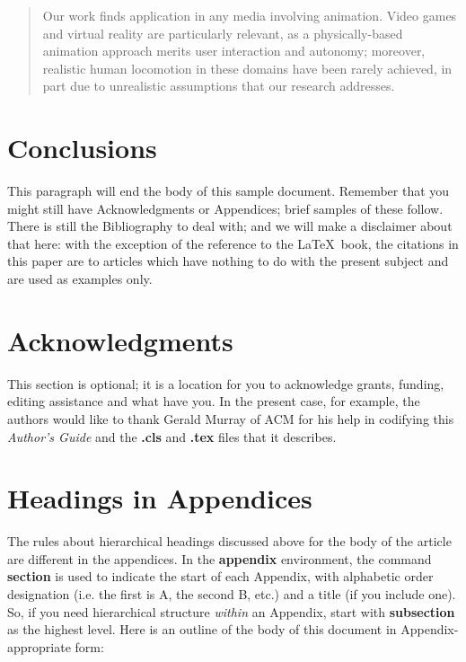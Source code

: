 \documentclass{sig-alternate-05-2015}
\begin{document}
\begin{abstract}
	Our work finds application in any media involving animation. Video games and virtual reality are particularly relevant, as a physically-based animation approach merits user interaction and autonomy; moreover, realistic human locomotion in these domains have been rarely achieved, in part due to unrealistic assumptions that our research addresses.
	
\end{abstract}





\iffalse

\section{Conclusions}
This paragraph will end the body of this sample document.
Remember that you might still have Acknowledgments or
Appendices; brief samples of these
follow.  There is still the Bibliography to deal with; and
we will make a disclaimer about that here: with the exception
of the reference to the \LaTeX\ book, the citations in
this paper are to articles which have nothing to
do with the present subject and are used as
examples only.

\section{Acknowledgments}
This section is optional; it is a location for you
to acknowledge grants, funding, editing assistance and
what have you.  In the present case, for example, the
authors would like to thank Gerald Murray of ACM for
his help in codifying this \textit{Author's Guide}
and the \textbf{.cls} and \textbf{.tex} files that it describes.

%

%
%
\appendix
\section{Headings in Appendices}
The rules about hierarchical headings discussed above for
the body of the article are different in the appendices.
In the \textbf{appendix} environment, the command
\textbf{section} is used to
indicate the start of each Appendix, with alphabetic order
designation (i.e. the first is A, the second B, etc.) and
a title (if you include one).  So, if you need
hierarchical structure
\textit{within} an Appendix, start with \textbf{subsection} as the
highest level. Here is an outline of the body of this
document in Appendix-appropriate form:
\end{document}

